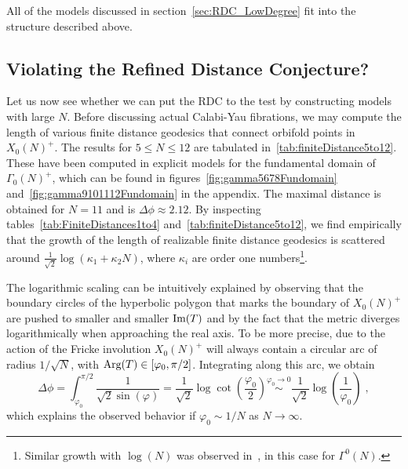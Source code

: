\documentclass[11pt,a4paper]{article}
\numberwithin{equation}{section}
\numberwithin{table}{section}\setlength{\multlinegap}{25pt}
\begin{document}
All of the models discussed in section~\ref{sec:RDC_LowDegree} fit into the structure described above.


\subsection{Violating the Refined Distance Conjecture?}
\label{subsec:ViolatingRDC}

Let us now see whether we can put the RDC to the test by constructing models with large $N$. Before discussing actual Calabi-Yau fibrations, we may compute the length of various finite distance geodesics that connect orbifold points in $X_0(N)^+$. The results for $5\leq N \leq 12$ are tabulated in~\ref{tab:finiteDistance5to12}. These have been computed in explicit models for the fundamental domain of $\Gamma_0(N)^+$, which can be found in figures~\ref{fig:gamma5678Fundomain} and~\ref{fig:gamma9101112Fundomain} in the appendix. The maximal distance is obtained for $N=11$ and is $\Delta\phi\approx 2.12$. By inspecting tables~\ref{tab:FiniteDistances1to4} and~\ref{tab:finiteDistance5to12}, we find empirically that the growth of the length of realizable finite distance geodesics is scattered around $\tfrac{1}{\sqrt{2}}\log(\kappa_1+\kappa_2 N)$, where $\kappa_i$ are order one numbers\footnote{Similar growth with $\log(N)$ was observed in~\cite{Hebecker:2017lxm}, in this case for $\Gamma^0(N)$.}.

The logarithmic scaling can be intuitively explained by observing that the boundary circles of the hyperbolic polygon that marks the boundary of $X_0(N)^+$ are pushed to smaller and smaller $\textup{Im}(T)$ and by the fact that the metric diverges logarithmically when approaching the real axis. To be more precise, due to the action of the Fricke involution $X_0(N)^+$ will always contain a circular arc of radius $1/\sqrt{N}$, with $\textup{Arg}(T)\in [\varphi_0,\pi/2]$. Integrating along this arc, we obtain
\begin{equation}
    \Delta\phi=\int_{\varphi_0}^{\pi/2}\frac{1}{\sqrt{2}\sin(\varphi)}=\frac{1}{\sqrt{2}}\log\cot\left(\frac{\varphi_0}{2}\right)\overset{\varphi_0\to 0}{\sim}\frac{1}{\sqrt{2}}\log\left(\frac{1}{\varphi_0}\right)\;,
\end{equation}
which explains the observed behavior if $\varphi_0\sim 1/N$ as $N\to \infty$.
\end{document}
